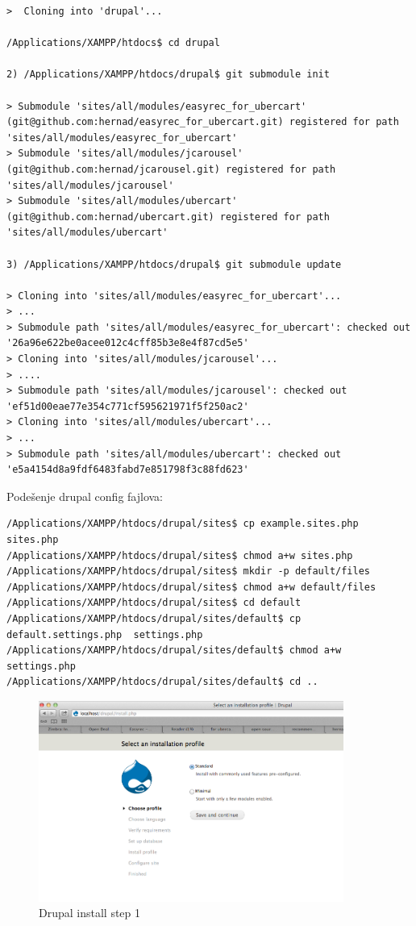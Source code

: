 \documentclass[times, utf8, seminar]{fit}
\begin{document}
{{{\begin{lstlisting}
>  Cloning into 'drupal'...

/Applications/XAMPP/htdocs$ cd drupal

2) /Applications/XAMPP/htdocs/drupal$ git submodule init 

> Submodule 'sites/all/modules/easyrec_for_ubercart' (git@github.com:hernad/easyrec_for_ubercart.git) registered for path 'sites/all/modules/easyrec_for_ubercart'
> Submodule 'sites/all/modules/jcarousel' (git@github.com:hernad/jcarousel.git) registered for path 'sites/all/modules/jcarousel'
> Submodule 'sites/all/modules/ubercart' (git@github.com:hernad/ubercart.git) registered for path 'sites/all/modules/ubercart'

3) /Applications/XAMPP/htdocs/drupal$ git submodule update

> Cloning into 'sites/all/modules/easyrec_for_ubercart'...
> ...
> Submodule path 'sites/all/modules/easyrec_for_ubercart': checked out '26a96e622be0acee012c4cff85b3e8e4f87cd5e5'
> Cloning into 'sites/all/modules/jcarousel'...
> ....
> Submodule path 'sites/all/modules/jcarousel': checked out 'ef51d00eae77e354c771cf595621971f5f250ac2'
> Cloning into 'sites/all/modules/ubercart'...
> ...
> Submodule path 'sites/all/modules/ubercart': checked out 'e5a4154d8a9fdf6483fabd7e851798f3c88fd623'
\end{lstlisting}

Podešenje drupal config fajlova:

\begin{lstlisting}
/Applications/XAMPP/htdocs/drupal/sites$ cp example.sites.php sites.php
/Applications/XAMPP/htdocs/drupal/sites$ chmod a+w sites.php
/Applications/XAMPP/htdocs/drupal/sites$ mkdir -p default/files
/Applications/XAMPP/htdocs/drupal/sites$ chmod a+w default/files
/Applications/XAMPP/htdocs/drupal/sites$ cd default
/Applications/XAMPP/htdocs/drupal/sites/default$ cp default.settings.php  settings.php
/Applications/XAMPP/htdocs/drupal/sites/default$ chmod a+w settings.php
/Applications/XAMPP/htdocs/drupal/sites/default$ cd ..
\end{lstlisting}

\begin{figure}[H]
\centering
\includegraphics[width=10cm]{img/drupal_install_1.png}
\caption{Drupal install step 1}
\end{figure}

}}}
\end{document}
